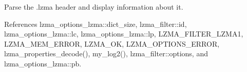 Parse the .lzma header and display information about it. 



References lzma\-\_\-options\-\_\-lzma\-::dict\-\_\-size, lzma\-\_\-filter\-::id, lzma\-\_\-options\-\_\-lzma\-::lc, lzma\-\_\-options\-\_\-lzma\-::lp, L\-Z\-M\-A\-\_\-\-F\-I\-L\-T\-E\-R\-\_\-\-L\-Z\-M\-A1, L\-Z\-M\-A\-\_\-\-M\-E\-M\-\_\-\-E\-R\-R\-O\-R, L\-Z\-M\-A\-\_\-\-O\-K, L\-Z\-M\-A\-\_\-\-O\-P\-T\-I\-O\-N\-S\-\_\-\-E\-R\-R\-O\-R, lzma\-\_\-properties\-\_\-decode(), my\-\_\-log2(), lzma\-\_\-filter\-::options, and lzma\-\_\-options\-\_\-lzma\-::pb.

